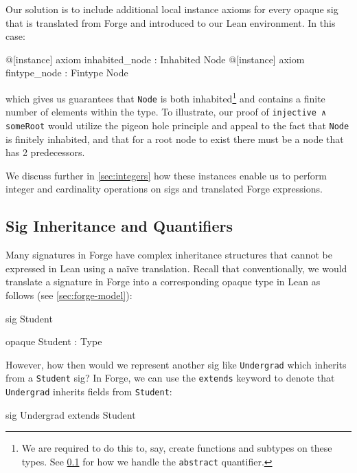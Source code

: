 Our solution is to include additional local instance axioms for every opaque sig that is translated from Forge and introduced to our Lean environment. In this case: 
\begin{lean*}
@[instance] axiom inhabited_node : Inhabited Node
@[instance] axiom fintype_node : Fintype Node
\end{lean*}
which gives us guarantees that \texttt{Node} is both inhabited\footnote{We are required to do this to, say, create functions and subtypes on these types. See \cref{sec:sigs} for how we handle the \texttt{abstract} quantifier.} and contains a finite number of elements within the type. To illustrate, our proof of \texttt{injective ∧ someRoot} would utilize the pigeon hole principle and appeal to the fact that \texttt{Node} is finitely inhabited, and that for a root node to exist there must be a node that has 2 predecessors. 

We discuss further in \cref{sec:integers} how these instances enable us to perform integer and cardinality operations on sigs and translated Forge expressions. 


\subsection{Sig Inheritance and Quantifiers}\label{sec:sigs}
Many signatures in Forge have complex inheritance structures \cite{jackson2012software} that cannot be expressed in Lean using a na\"ive translation. Recall that conventionally, we would translate a signature in Forge into a corresponding opaque type in Lean as follows (see \cref{sec:forge-model}):

\vspace{0.5em}
\noindent\begin{minipage}{0.5\textwidth}
\begin{forge*}sig Student {}\end{forge*}
\end{minipage}%
\begin{minipage}{0.5\textwidth}
\begin{lean*}opaque Student : Type\end{lean*}
\end{minipage}
\vspace{0.5em}

However, how then would we represent another sig like \texttt{Undergrad} which inherits from a \texttt{Student} sig? In Forge, we can use the \texttt{extends} keyword to denote that \texttt{Undergrad} inherits fields from \texttt{Student}: 
\begin{forge*}
sig Undergrad extends Student {}
\end{forge*}

